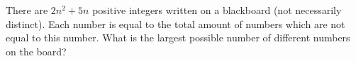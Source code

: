 \problem
There are $2 n^2 + 5 n$ positive integers written on a blackboard
(not necessarily distinct).
Each number is equal to the total amount of numbers which are not equal to this
number.
What is the largest possible number of different numbers on the board?
\solution
\endproblem

